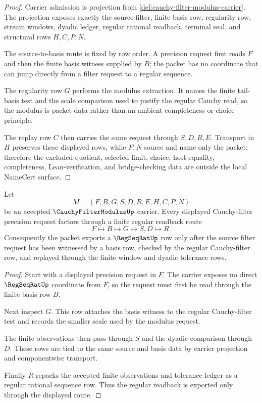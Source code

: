 \begin{proof}
Carrier admission is projection from \autoref{def:cauchy-filter-modulus-carrier}. The projection exposes exactly the source filter, finite basis row, regularity row, stream windows, dyadic ledger, regular rational readback, terminal seal, and structural rows $H,C,P,N$.

The source-to-basis route is fixed by row order. A precision request first reads $F$ and then the finite basis witness supplied by $B$; the packet has no coordinate that can jump directly from a filter request to a regular sequence.

The regularity row $G$ performs the modulus extraction. It names the finite tail-basis test and the scale comparison used to justify the regular Cauchy read, so the modulus is packet data rather than an ambient completeness or choice principle.

The replay row $C$ then carries the same request through $S,D,R,E$. Transport in $H$ preserves these displayed rows, while $P,N$ source and name only the packet; therefore the excluded quotient, selected-limit, choice, host-equality, completeness, Lean-verification, and bridge-checking data are outside the local NameCert surface.
\end{proof}

\begin{theorem}
\label{thm:cauchy-filter-modulus-regular-readback}
Let
$$
M=(F,B,G,S,D,R,E,H,C,P,N)
$$
be an accepted $\CauchyFilterModulusUp$ carrier. Every displayed Cauchy-filter precision request factors through a finite regular readback route
$$
F \longmapsto B \longmapsto G \longmapsto S,D \longmapsto R .
$$
Consequently the packet exports a $\RegSeqRatUp$ row only after the source filter request has been witnessed by a basis row, checked by the regular Cauchy-filter row, and replayed through the finite window and dyadic tolerance rows.
\end{theorem}
\begin{proof}
Start with a displayed precision request in $F$. The carrier exposes no direct $\RegSeqRatUp$ coordinate from $F$, so the request must first be read through the finite basis row $B$.

Next inspect $G$. This row attaches the basis witness to the regular Cauchy-filter test and records the smaller scale used by the modulus request.

The finite observations then pass through $S$ and the dyadic comparison through $D$. These rows are tied to the same source and basis data by carrier projection and componentwise transport.

Finally $R$ repacks the accepted finite observations and tolerance ledger as a regular rational sequence row. Thus the regular readback is exported only through the displayed route.
\end{proof}

